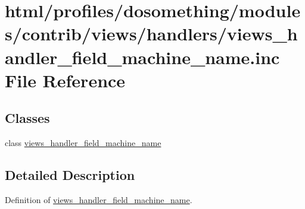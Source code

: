 \hypertarget{views__handler__field__machine__name_8inc}{
\section{html/profiles/dosomething/modules/contrib/views/handlers/views\_\-handler\_\-field\_\-machine\_\-name.inc File Reference}
\label{views__handler__field__machine__name_8inc}
}
\subsection*{Classes}
\begin{DoxyCompactItemize}
\item 
class \hyperlink{classviews__handler__field__machine__name}{views\_\-handler\_\-field\_\-machine\_\-name}
\end{DoxyCompactItemize}


\subsection{Detailed Description}
Definition of \hyperlink{classviews__handler__field__machine__name}{views\_\-handler\_\-field\_\-machine\_\-name}. 